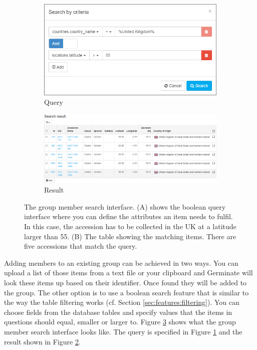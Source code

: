 \begin{figure}
	\centering
	\begin{subfigure}[b]{0.3\linewidth}
		\includegraphics[width=1\linewidth]{img/features/groups-search-query.png}
		\caption{Query}
		\label{fig:features:groups-search-query}
	\end{subfigure}
	\begin{subfigure}[b]{0.68\linewidth}
		\includegraphics[width=1\linewidth]{img/features/groups-search-result.png}
		\caption{Result}
		\label{fig:features:groups-search-result}
	\end{subfigure}
	\caption{The group member search interface. (A) shows the boolean query interface where you can define the attributes an item needs to fulfil. In this case, the accession has to be collected in the UK at a latitude larger than 55. (B) The table showing the matching items. There are five accessions that match the query.}
	\label{fig:features:groups-search}
\end{figure}

Adding members to an existing group can be achieved in two ways. You can upload a list of those items from a text file or your clipboard and Germinate will look these items up based on their identifier. Once found they will be added to the group. The other option is to use a boolean search feature that is similar to the way the table filtering works (cf. Section \ref{sec:features:filtering}). You can choose fields from the database tables and specify values that the items in questions should equal, smaller or larger to. Figure \ref{fig:features:groups-search} shows what the group member search interface looks like. The query is specified in Figure \ref{fig:features:groups-search-query} and the result shown in Figure \ref{fig:features:groups-search-result}.


